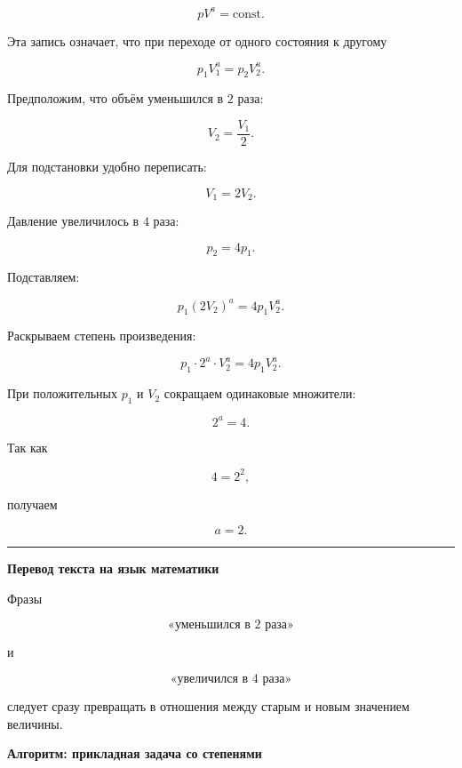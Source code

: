\documentclass[a4paper,12pt]{article}
\newcommand{\keyidea}[1]{%
  \par\medskip
  {\color{accent}\rule{8mm}{1.2pt}}\quad
  \textbf{#1}
  \par\smallskip
}
\begin{document}
\[
pV^a=\mathrm{const}.
\]

Эта запись означает, что при переходе от одного состояния к другому

\[
p_1V_1^a=p_2V_2^a.
\]

Предположим, что объём уменьшился в \(2\) раза:

\[
V_2=\frac{V_1}{2}.
\]

Для подстановки удобно переписать:

\[
V_1=2V_2.
\]

Давление увеличилось в \(4\) раза:

\[
p_2=4p_1.
\]

Подставляем:

\[
p_1(2V_2)^a
=
4p_1V_2^a.
\]

Раскрываем степень произведения:

\[
p_1\cdot2^a\cdot V_2^a
=
4p_1V_2^a.
\]

При положительных \(p_1\) и \(V_2\) сокращаем одинаковые множители:

\[
2^a=4.
\]

Так как

\[
4=2^2,
\]

получаем

\[
\boxed{a=2}.
\]

\keyidea{Перевод текста на язык математики}

Фразы

\[
\text{«уменьшился в 2 раза»}
\]

и

\[
\text{«увеличился в 4 раза»}
\]

следует сразу превращать в отношения между старым и новым
значением величины.

\clearpage
\thispagestyle{fancy}

\begin{center}
{\LARGE\bfseries\color{darkaccent}
Алгоритм: прикладная задача со степенями
}
\end{center}

\vspace{6mm}
\end{document}
